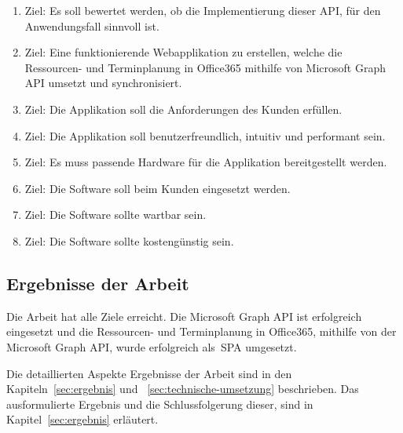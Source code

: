 \begin{enumerate}
    \item Ziel: Es soll bewertet werden, ob die Implementierung dieser API, für den Anwendungsfall sinnvoll ist.
    \item Ziel: Eine funktionierende Webapplikation zu erstellen, welche die Ressourcen- und Terminplanung in Office365 mithilfe von Microsoft Graph API umsetzt und synchronisiert.
    \item Ziel: Die Applikation soll die Anforderungen des Kunden erfüllen.
    \item Ziel: Die Applikation soll benutzerfreundlich, intuitiv und performant sein.
    \item Ziel: Es muss passende Hardware für die Applikation bereitgestellt werden.
    \item Ziel: Die Software soll beim Kunden eingesetzt werden.
    \item Ziel: Die Software sollte wartbar sein.
    \item Ziel: Die Software sollte kostengünstig sein.
\end{enumerate}
    \subsection{Ergebnisse der Arbeit}\label{subsec:ergebnisse-der-arbeit}
Die Arbeit hat alle Ziele erreicht.
    Die Microsoft Graph API ist erfolgreich eingesetzt und die Ressourcen- und Terminplanung in Office365, mithilfe von der Microsoft Graph API, wurde erfolgreich als~\gls{SPA} umgesetzt.

Die detaillierten Aspekte Ergebnisse der Arbeit sind in den Kapiteln~\ref{sec:ergebnis} und ~\ref{sec:technische-umsetzung} beschrieben.
Das ausformulierte Ergebnis und die Schlussfolgerung dieser, sind in Kapitel~\ref{sec:ergebnis} erläutert.
\newpage

